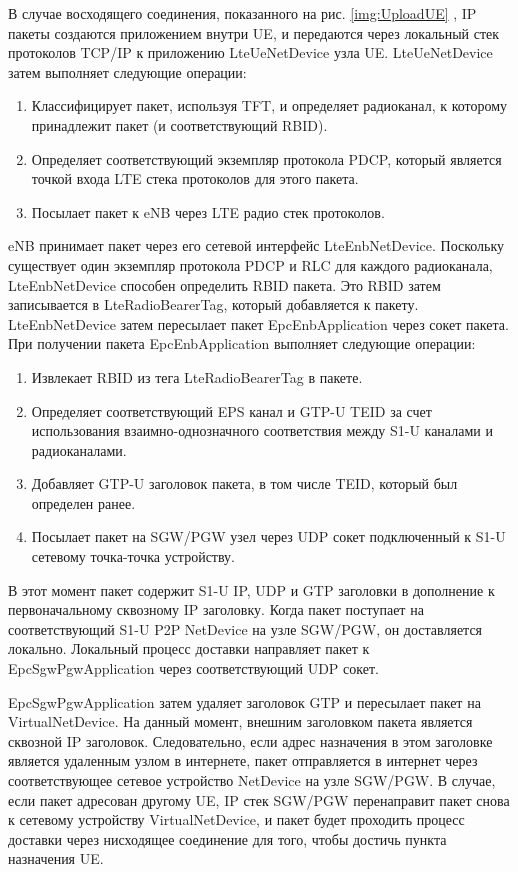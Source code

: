 В случае восходящего соединения, показанного на рис. \ref{img:UploadUE} , IP пакеты создаются приложением внутри UE, и передаются через локальный стек протоколов TCP/IP к приложению LteUeNetDevice узла UE. 
LteUeNetDevice затем выполняет следующие операции:

\begin{enumerate}
  \item Классифицирует пакет, используя TFT, и определяет радиоканал, к которому принадлежит пакет (и соответствующий RBID).
  \item Определяет соответствующий экземпляр протокола PDCP, который является точкой входа LTE стека протоколов для этого пакета.
  \item Посылает пакет к eNB через LTE радио стек протоколов.
\end{enumerate}

eNB принимает пакет через его сетевой интерфейс LteEnbNetDevice. 
Поскольку существует один экземпляр протокола PDCP и RLC для каждого радиоканала, LteEnbNetDevice способен определить RBID пакета. 
Это RBID затем записывается в LteRadioBearerTag, который добавляется к пакету. 
LteEnbNetDevice затем пересылает пакет EpcEnbApplication через сокет пакета.
При получении пакета EpcEnbApplication выполняет следующие операции:

\begin{enumerate}
  \item Извлекает RBID из тега LteRadioBearerTag в пакете.
  \item Определяет соответствующий EPS канал и GTP-U TEID за счет использования взаимно-однозначного соответствия между S1-U каналами и радиоканалами.
  \item Добавляет GTP-U заголовок пакета, в том числе TEID, который был определен ранее.
  \item Посылает пакет на SGW/PGW узел через UDP сокет подключенный к S1-U сетевому точка-точка устройству.
\end{enumerate}

В этот момент пакет содержит S1-U IP, UDP и GTP заголовки в дополнение к первоначальному сквозному IP заголовку. 
Когда пакет поступает на соответствующий S1-U P2P NetDevice на узле SGW/PGW, он доставляется локально. 
Локальный процесс доставки направляет пакет к EpcSgwPgwApplication через соответствующий UDP сокет. 

EpcSgwPgwApplication затем удаляет заголовок GTP и пересылает пакет на VirtualNetDevice. 
На данный момент, внешним заголовком пакета является сквозной IP заголовок. 
Следовательно, если адрес назначения в этом заголовке является удаленным узлом в интернете, пакет отправляется в интернет через соответствующее сетевое устройство NetDevice на узле SGW/PGW. 
В случае, если пакет адресован другому UE, IP стек SGW/PGW перенаправит пакет снова к сетевому устройству VirtualNetDevice, и пакет будет проходить процесс доставки через нисходящее соединение для того, чтобы достичь пункта назначения UE.

